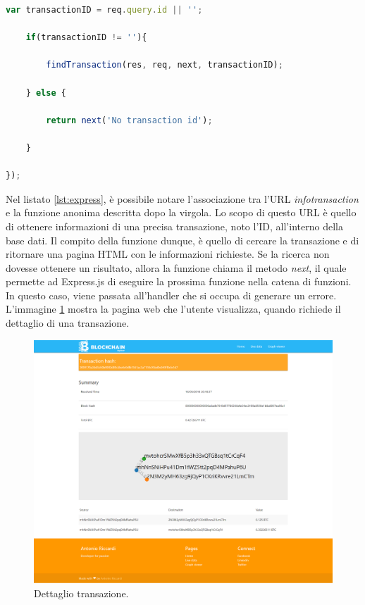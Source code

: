 \begin{itemize}
\begin{lstlisting}[language=Javascript, label=lst:express, caption={Associazione URL-Callback in Express.}]
    var transactionID = req.query.id || '';

    if(transactionID != ''){

        findTransaction(res, req, next, transactionID);

    } else {

        return next('No transaction id');

    }

});
\end{lstlisting}
Nel listato \ref{lst:express}, è possibile notare l'associazione tra l'URL \textit{infotransaction} e la funzione anonima descritta dopo la virgola. Lo scopo di questo URL è quello di ottenere informazioni di una precisa transazione, noto l'ID, all'interno della base dati. Il compito della funzione dunque, è quello di cercare la transazione e di ritornare una pagina HTML con le informazioni richieste. Se la ricerca non dovesse ottenere un risultato, allora la funzione chiama il metodo \textit{next}, il quale permette ad Express.js di eseguire la prossima funzione nella catena di funzioni. In questo caso, viene passata all'handler che si occupa di generare un errore. L'immagine  \ref{fig:transactionDetail} mostra la pagina web che l'utente visualizza, quando richiede il dettaglio di una transazione.  

\begin{figure}[H]
	\centering
	\includegraphics[width=\textwidth]{images/infoTransaction2.png}
	\caption{Dettaglio transazione.}
	\label{fig:transactionDetail}
\end{figure}
 

\end{itemize}

